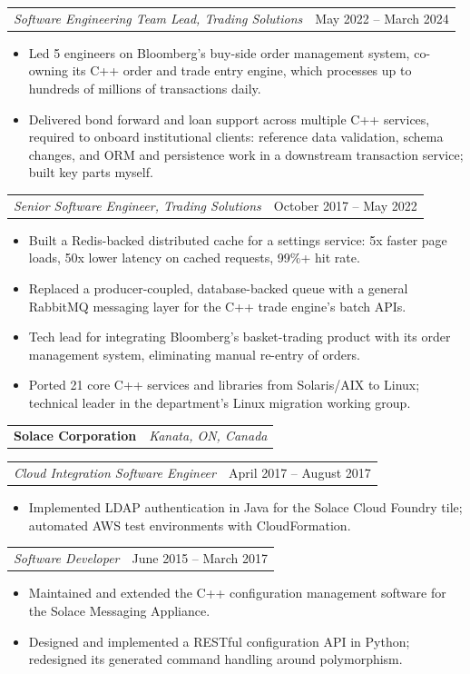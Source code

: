 \documentclass[letterpaper,11pt]{article}
\makeatletter
\newcommand{\resumeItem}[1]{
  \item\small{
    {#1 \vspace{-2pt}}
  }
}
\newcommand{\resumeSubSubheading}[2]{
    \item
    \begin{tabular*}{0.97\textwidth}{l@{\extracolsep{\fill}}r}
      \textit{\small#1} & \textit{\small #2} \\
    \end{tabular*}\vspace{-7pt}
}
\newcommand{\resumeCompany}[2]{
  \vspace{-2pt}\item
    \begin{tabular*}{0.97\textwidth}[t]{l@{\extracolsep{\fill}}r}
      \textbf{#1} & \textit{\small #2} \\
    \end{tabular*}\vspace{-7pt}
}
\newcommand{\resumeRole}[2]{
  \vspace{1pt}\item
    \begin{tabular*}{0.97\textwidth}{l@{\extracolsep{\fill}}r}
      \textit{\small#1} & {\small #2} \\
    \end{tabular*}\vspace{-7pt}
}
\newcommand{\resumeSubHeadingListEnd}{\end{itemize}}
\newcommand{\resumeItemListStart}{\begin{itemize}}
\newcommand{\resumeItemListEnd}{\end{itemize}\vspace{-5pt}}
\makeatother
\begin{document}
      \resumeRole
      {Software Engineering Team Lead, Trading Solutions}{May 2022 -- March 2024}
      \resumeItemListStart
        \resumeItem{Led 5 engineers on Bloomberg's buy-side order management system, co-owning its C++ order and trade entry engine, which processes up to hundreds of millions of transactions daily.}
        \resumeItem{Delivered bond forward and loan support across multiple C++ services, required to onboard institutional clients: reference data validation, schema changes, and ORM and persistence work in a downstream transaction service; built key parts myself.}
      \resumeItemListEnd

      \resumeRole
      {Senior Software Engineer, Trading Solutions}{October 2017 -- May 2022}
      \resumeItemListStart
        \resumeItem{Built a Redis-backed distributed cache for a settings service: 5x faster page loads, 50x lower latency on cached requests, 99\%+ hit rate.}
        \resumeItem{Replaced a producer-coupled, database-backed queue with a general RabbitMQ messaging layer for the C++ trade engine's batch APIs.}
        \resumeItem{Tech lead for integrating Bloomberg's basket-trading product with its order management system, eliminating manual re-entry of orders.}
        \resumeItem{Ported 21 core C++ services and libraries from Solaris/AIX to Linux; technical leader in the department's Linux migration working group.}
      \resumeItemListEnd

      \resumeCompany{Solace Corporation}{Kanata, ON, Canada}

      \resumeRole
      {Cloud Integration Software Engineer}{April 2017 -- August 2017}
      \resumeItemListStart
        \resumeItem{Implemented LDAP authentication in Java for the Solace Cloud Foundry tile; automated AWS test environments with CloudFormation.}
      \resumeItemListEnd

      \resumeRole
      {Software Developer}{June 2015 -- March 2017}
      \resumeItemListStart
        \resumeItem{Maintained and extended the C++ configuration management software for the Solace Messaging Appliance.}
        \resumeItem{Designed and implemented a RESTful configuration API in Python; redesigned its generated command handling around polymorphism.}
      \resumeItemListEnd
      
\end{document}

